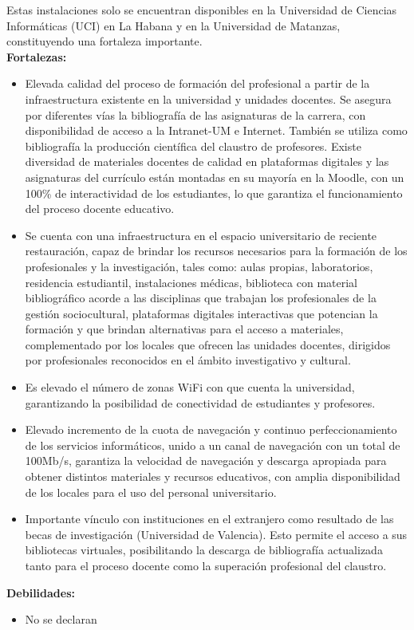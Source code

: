 Estas instalaciones solo se encuentran disponibles en la Universidad de Ciencias Informáticas (UCI) en La Habana y en la Universidad de Matanzas, constituyendo una fortaleza importante.\\

\textbf{Fortalezas:}

\begin{itemize}
	\setlength\itemsep{-0.5em}
	\item Elevada calidad del proceso de formación del profesional a partir de la infraestructura existente en la universidad y unidades docentes. Se asegura por diferentes vías la bibliografía de las asignaturas de la carrera, con disponibilidad de acceso a la Intranet-UM e Internet. También se utiliza como bibliografía la producción científica del claustro de profesores. Existe diversidad de materiales docentes de calidad en plataformas digitales y las asignaturas del currículo están montadas en su mayoría en la Moodle, con un 100\% de interactividad de los estudiantes, lo que garantiza el funcionamiento del proceso docente educativo. 
	\item Se cuenta con una infraestructura en el espacio universitario de reciente restauración, capaz de brindar los recursos necesarios para la formación de los profesionales y la investigación, tales como: aulas propias, laboratorios, residencia estudiantil, instalaciones médicas, biblioteca con material bibliográfico acorde a las disciplinas que trabajan los profesionales de la gestión sociocultural, plataformas digitales interactivas que potencian la formación y que brindan alternativas para el acceso a materiales, complementado por los locales que ofrecen las unidades docentes, dirigidos por profesionales reconocidos en el ámbito investigativo y cultural. 
	\item Es elevado el número de zonas WiFi con que cuenta la universidad, garantizando la posibilidad de conectividad de estudiantes y profesores.
	\item Elevado incremento de la cuota de navegación y continuo perfeccionamiento de los servicios informáticos, unido a un canal de navegación con un total de 100Mb/s, garantiza la velocidad de navegación y descarga apropiada para obtener distintos materiales y recursos educativos, con amplia disponibilidad de los locales para el uso del personal universitario.
	\item Importante vínculo con instituciones en el extranjero como resultado de las becas de investigación (Universidad de Valencia). Esto permite el acceso a sus bibliotecas virtuales, posibilitando la descarga de bibliografía actualizada tanto para el proceso docente como la superación profesional del claustro.
\end{itemize}

\textbf{Debilidades:}
\begin{itemize}
	\setlength\itemsep{-0.5em}
	\item No se declaran
\end{itemize}